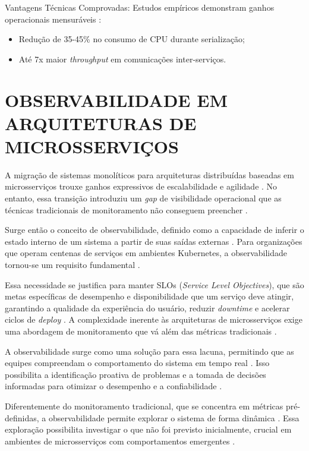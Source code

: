 Vantagens Técnicas Comprovadas: Estudos empíricos demonstram ganhos operacionais mensuráveis \cite{niswar2023performance}:
\begin{itemize}
    \item Redução de 35-45\% no consumo de CPU durante serialização;
    \item Até 7x maior \textit{throughput} em comunicações inter-serviços.
\end{itemize}
\section{OBSERVABILIDADE EM ARQUITETURAS DE MICROSSERVIÇOS}
\label{cap:observabilidade}

A migração de sistemas monolíticos para arquiteturas distribuídas baseadas em microsserviços trouxe ganhos expressivos de escalabilidade e agilidade \cite{jamshidi2016systematic}. No entanto, essa transição introduziu um \textit{gap} de visibilidade operacional que as técnicas tradicionais de monitoramento não conseguem preencher \cite{nizami2020comparison}.

Surge então o conceito de observabilidade, definido como a capacidade de inferir o estado interno de um sistema a partir de suas saídas externas \cite{observability2023}. Para organizações que operam centenas de serviços em ambientes Kubernetes, a observabilidade tornou-se um requisito fundamental \cite{shekhar2023microservices}.

Essa necessidade se justifica para manter SLOs (\textit{Service Level Objectives}), que são metas específicas de desempenho e disponibilidade que um serviço deve atingir, garantindo a qualidade da experiência do usuário, reduzir \textit{downtime} e acelerar ciclos de \textit{deploy} \cite{shekhar2023microservices}. A complexidade inerente às arquiteturas de microsserviços exige uma abordagem de monitoramento que vá além das métricas tradicionais \cite{jamshidi2016systematic}.

A observabilidade surge como uma solução para essa lacuna, permitindo que as equipes compreendam o comportamento do sistema em tempo real \cite{observability2023}. Isso possibilita a identificação proativa de problemas e a tomada de decisões informadas para otimizar o desempenho e a confiabilidade \cite{shekhar2023microservices}.

Diferentemente do monitoramento tradicional, que se concentra em métricas pré-definidas, a observabilidade permite explorar o sistema de forma dinâmica \cite{observability2023}. Essa exploração possibilita investigar o que não foi previsto inicialmente, crucial em ambientes de microsserviços com comportamentos emergentes \cite{nizami2020comparison}.

